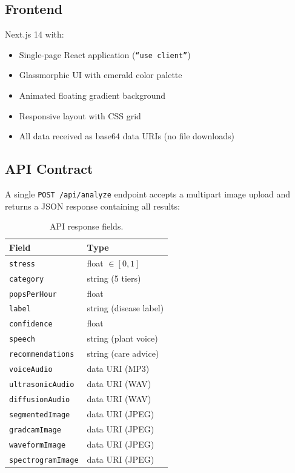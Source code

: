 \documentclass[11pt,a4paper,twocolumn]{article}
\begin{document}
\subsection{Frontend}

Next.js 14 with:
\begin{itemize}[nosep]
    \item Single-page React application (\texttt{``use client''})
    \item Glassmorphic UI with emerald color palette
    \item Animated floating gradient background
    \item Responsive layout with CSS grid
    \item All data received as base64 data URIs (no file downloads)
\end{itemize}

\subsection{API Contract}

A single \texttt{POST /api/analyze} endpoint accepts a multipart image upload and returns a JSON response containing all results:

\begin{table}[H]
\centering
\caption{API response fields.}
\label{tab:api}
\small
\begin{tabular}{@{}ll@{}}
\toprule
\textbf{Field} & \textbf{Type} \\
\midrule
\texttt{stress} & float $\in [0, 1]$ \\
\texttt{category} & string (5 tiers) \\
\texttt{popsPerHour} & float \\
\texttt{label} & string (disease label) \\
\texttt{confidence} & float \\
\texttt{speech} & string (plant voice) \\
\texttt{recommendations} & string (care advice) \\
\texttt{voiceAudio} & data URI (MP3) \\
\texttt{ultrasonicAudio} & data URI (WAV) \\
\texttt{diffusionAudio} & data URI (WAV) \\
\texttt{segmentedImage} & data URI (JPEG) \\
\texttt{gradcamImage} & data URI (JPEG) \\
\texttt{waveformImage} & data URI (JPEG) \\
\texttt{spectrogramImage} & data URI (JPEG) \\
\bottomrule
\end{tabular}
\end{table}
\end{document}
